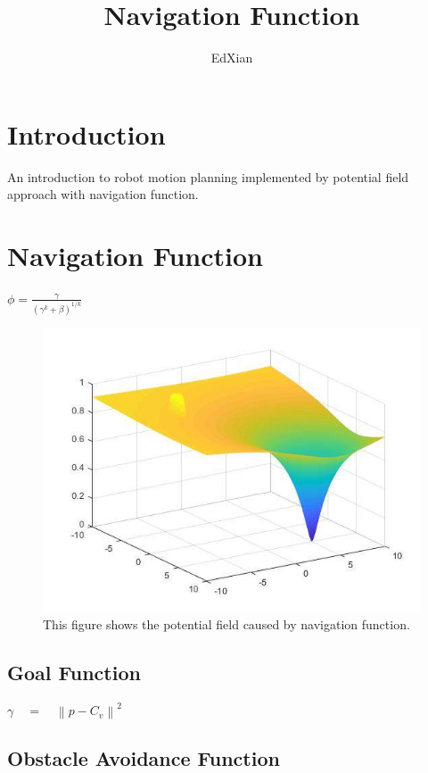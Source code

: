 \documentclass[a4paper]{article}
\title{Navigation Function}
\author{EdXian}
\begin{document}
\maketitle



\section{Introduction}

An introduction to robot motion planning implemented by potential field approach with navigation function.

\section{Navigation Function}

{\huge $\phi =\frac { { \gamma  } }{ { \left( { \gamma  }^{ k }+\beta  \right)  }^{ 1/k } } $}

\begin{figure}
\centering
\includegraphics[width=1\textwidth]{potential2.jpg}
\caption{\label{fig:Potential filed}This figure shows the potential field caused by navigation function.}
\end{figure}

\subsection{Goal Function}

 {\Large $\gamma \quad =\quad { \left\| p-{ C }_{ v } \right\|  }^{ 2 } $}


\subsection{Obstacle Avoidance Function}
\end{document}
